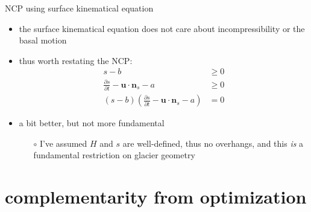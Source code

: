 \documentclass[10pt,hyperref,dvipsnames]{beamer}
\newcommand{\bn}{\mathbf{n}}
\newcommand{\bu}{\mathbf{u}}
\begin{document}
\begin{frame}{NCP using surface kinematical equation}

\begin{itemize}
\item the surface kinematical equation does not care about incompressibility or the basal motion
\item thus worth restating the NCP:
\begin{align*}
s-b &\ge 0 \\
\frac{\partial s}{\partial t} - \bu \cdot \bn_s - a &\ge 0 \\
(s-b) \left(\frac{\partial s}{\partial t} - \bu \cdot \bn_s - a\right) &= 0
\end{align*}

\medskip
\item a bit better, but not more fundamental
    \begin{itemize}
    \item[$\circ$] I've assumed $H$ and $s$ are well-defined, thus no overhangs, and this \emph{is} a fundamental restriction on glacier geometry
    \end{itemize}
\end{itemize}
\end{frame}


\section{complementarity from optimization}

\newcommand{\blambda}{\bm{\lambda}}
\end{document}
